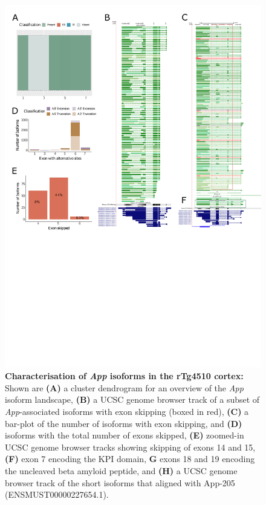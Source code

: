 \begin{figure}[htp]
	\centering
	\includegraphics[page=2,trim={0 2.2cm 0 0},scale = 0.85]{Figures/TargetGenes_Annotation_Portrait.pdf}
	\captionsetup{width=0.95\textwidth}
	\caption[Characterisation of \textit{App} isoforms in the rTg4510 cortex]%
	{\textbf{Characterisation of \textit{App} isoforms in the rTg4510 cortex:} Shown are \textbf{(A)} a cluster dendrogram for an overview of the \textit{App} isoform landscape, \textbf{(B)} a UCSC genome browser track of a subset of \textit{App}-associated isoforms with exon skipping (boxed in red), \textbf{(C)} a bar-plot of the number of isoforms with exon skipping, and \textbf{(D)} isoforms with the total number of exons skipped, \textbf{(E)} zoomed-in UCSC genome browser tracks showing skipping of exons 14 and 15, \textbf{(F)} exon 7 encoding the KPI domain, \textbf{G} exons 18 and 19 encoding the uncleaved beta amyloid peptide, and \textbf{(H)} a UCSC genome browser track of the short isoforms that aligned with App-205 (ENSMUST00000227654.1).}    
	\label{fig:app}
\end{figure}
\restoregeometry

